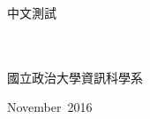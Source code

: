 \begin{acknowledgementsCH}

\setlength{\baselineskip}{1.5em}
中文測試
\\
\\
\\

\raggedright{國立政治大學資訊科學系}

\raggedright{November\ 2016}

\end{acknowledgementsCH}
